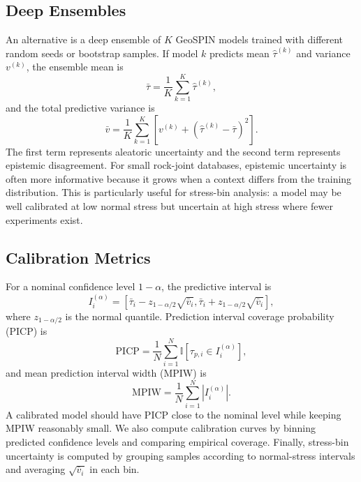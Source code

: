 \documentclass[journal]{IEEEtran}
\begin{document}
\subsection{Deep Ensembles}
An alternative is a deep ensemble of $K$ GeoSPIN models trained with different random seeds or bootstrap samples. If model $k$ predicts mean $\widehat{\tau}^{(k)}$ and variance $v^{(k)}$, the ensemble mean is
\begin{equation}
\bar{\tau}=\frac{1}{K}\sum_{k=1}^{K}\widehat{\tau}^{(k)},
\end{equation}
and the total predictive variance is
\begin{equation}
\bar v=\frac{1}{K}\sum_{k=1}^{K}\left[v^{(k)}+(\widehat{\tau}^{(k)}-\bar{\tau})^2\right].
\end{equation}
The first term represents aleatoric uncertainty and the second term represents epistemic disagreement. For small rock-joint databases, epistemic uncertainty is often more informative because it grows when a context differs from the training distribution. This is particularly useful for stress-bin analysis: a model may be well calibrated at low normal stress but uncertain at high stress where fewer experiments exist.

\subsection{Calibration Metrics}
For a nominal confidence level $1-\alpha$, the predictive interval is
\begin{equation}
I_i^{(\alpha)}=[\bar{\tau}_i-z_{1-\alpha/2}\sqrt{\bar v_i},\bar{\tau}_i+z_{1-\alpha/2}\sqrt{\bar v_i}],
\end{equation}
where $z_{1-\alpha/2}$ is the normal quantile. Prediction interval coverage probability (PICP) is
\begin{equation}
\mathrm{PICP}=\frac{1}{N}\sum_{i=1}^{N}\mathbb{I}[\tau_{p,i}\in I_i^{(\alpha)}],
\end{equation}
and mean prediction interval width (MPIW) is
\begin{equation}
\mathrm{MPIW}=\frac{1}{N}\sum_{i=1}^{N}|I_i^{(\alpha)}|.
\end{equation}
A calibrated model should have PICP close to the nominal level while keeping MPIW reasonably small. We also compute calibration curves by binning predicted confidence levels and comparing empirical coverage. Finally, stress-bin uncertainty is computed by grouping samples according to normal-stress intervals and averaging $\sqrt{\bar v_i}$ in each bin.
\end{document}
